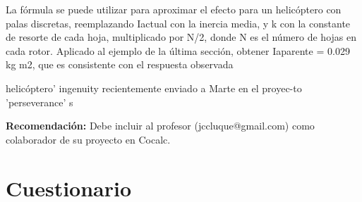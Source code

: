 \documentclass[12pt,oneside,spanish]{article}
\begin{document}
\begin{enumerate}
La fórmula se puede utilizar para aproximar el efecto para un helicóptero con palas discretas, reemplazando Iactual con la inercia media, y k con la constante de resorte de cada hoja, multiplicado por N/2, donde N es el número de hojas en cada rotor. Aplicado al ejemplo de la última sección,
obtener Iaparente = 0.029 kg m2, que es consistente con el respuesta observada

\end{enumerate}helicóptero’ ingenuity recientemente enviado a Marte en el proyec-to ’perseverance’ s

\textbf{Recomendación:} Debe incluir al profesor (jccluque@gmail.com) como colaborador de su proyecto en Cocalc.
\section{Cuestionario}
\end{document}
